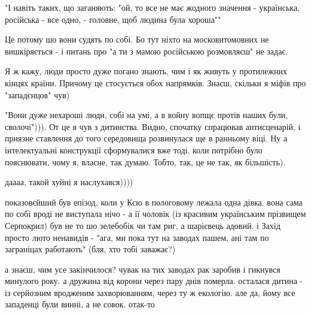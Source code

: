 \begin{itemize}
\begin{itemize}
"І навіть таких, що заганяють: "ой, то все не має жодного значення -
українська, російська - все одно, - головне, щоб людина була хороша""

Це потому шо вони судять по собі. Бо тут ніхто на московитомовних не
вишкіряється - і питань про "а ти з мамою російською розмовляєш" не задає.

Я ж кажу, люди просто дуже погано знають, чим і як живуть у протилежних кінцях
країни. Причому це стосується обох напрямків. Знаєш, скільки я міфів про
"западєнцов" чув)


 

"Вони дуже нехароші люди, собі на умі, а в войну вопщє протів наших були,
сволочі"))). От це я чув з дитинства. Видно, спочатку спрацював антисценарій, і
приязне ставлення до того середовища розвинулася ще в ранньому віці. Ну а
інтелектуальні конструкції сформувалися вже тоді, коли потрібно було
пояснювати, чому я, власне, так думаю. Тобто, так, це не так, як більшість).

 
даааа, такой хуйні я наслухався))))

показовєйший був епізод, коли у Ксю в пологовому лежала одна дівка. вона сама
по собі вроді не виступала нічо - а її чоловік (із красивим українським
прізвищем Серпокрил) був не то шо зелебобік чи там риг, а шарієвець адовий. і
Захід просто люто ненавидів - "ага, ми пока тут на заводах пашем, ані там по
заграніцах работають" (бля, хто тобі заважає?)

а знаєш, чим усе закінчилося? чувак на тих заводах рак заробив і гикнувся
минулого року. а дружина від корони через пару днів померла. осталася дитина -
із серйозним вродженим захворюванням, через ту ж екологію. але да, йому все
западенці були винні, а не совок. отак-то


 

\end{itemize}
\end{itemize}
